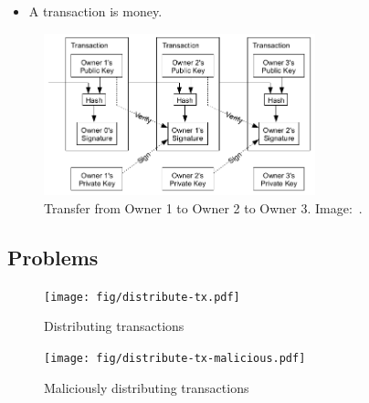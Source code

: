 \begin{frame}
  \begin{idea}
    \begin{itemize}
      \item A transaction is money.
    \end{itemize}
  \end{idea}

  \begin{figure}
    \includegraphics[width=0.7\textwidth]{fig/bitcoin-transfer.png}
    \caption{Transfer from Owner 1 to Owner 2 to Owner 3.
    Image:~\cite{Nakamoto2008bap}.}
  \end{figure}
\end{frame}


\subsection{Problems}

\begin{frame}
  \begin{figure}
    \texttt{[image: fig/distribute-tx.pdf]}
    \caption{Distributing transactions}
  \end{figure}
\end{frame}

\begin{frame}
  \begin{figure}
    \texttt{[image: fig/distribute-tx-malicious.pdf]}
    \caption{Maliciously distributing transactions}
  \end{figure}
\end{frame}


